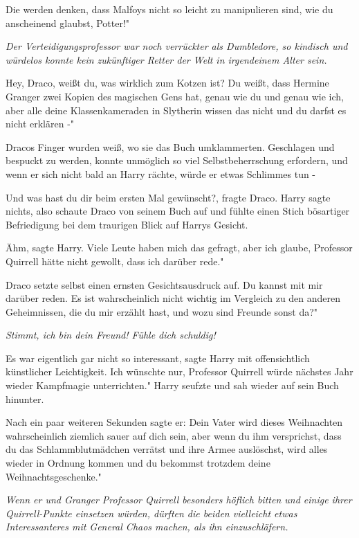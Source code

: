 \glqq{}Die werden denken, dass Malfoys nicht so leicht zu manipulieren sind, wie
du anscheinend glaubst, Potter!"

\emph{Der Verteidigungsprofessor war noch verrückter als Dumbledore, so
kindisch und würdelos konnte kein zukünftiger Retter der Welt in irgendeinem
Alter sein.}

\glqq{}Hey, Draco, weißt du, was wirklich zum Kotzen ist? Du weißt, dass Hermine
Granger zwei Kopien des magischen Gens hat, genau wie du und genau wie ich, aber
alle deine Klassenkameraden in Slytherin wissen das nicht und du darfst es nicht
erklären -"

Dracos Finger wurden weiß, wo sie das Buch umklammerten. Geschlagen und bespuckt
zu werden, konnte unmöglich so viel Selbstbeherrschung erfordern, und wenn er
sich nicht bald an Harry rächte, würde er etwas Schlimmes tun -

\glqq{}Und was hast du dir beim ersten Mal gewünscht?\grqq{}, fragte Draco. Harry
sagte nichts, also schaute Draco von seinem Buch auf und fühlte einen Stich
bösartiger Befriedigung bei dem traurigen Blick auf Harrys Gesicht.

\glqq{}Ähm\grqq{}, sagte Harry. \glqq{}Viele Leute haben mich das gefragt, aber
ich glaube, Professor Quirrell hätte nicht gewollt, dass ich darüber rede."

Draco setzte selbst einen ernsten Gesichtsausdruck auf. \glqq{}Du kannst mit mir
darüber reden. Es ist wahrscheinlich nicht wichtig im Vergleich zu den anderen
Geheimnissen, die du mir erzählt hast, und wozu sind Freunde sonst da?"

\emph{Stimmt, ich bin dein Freund! Fühle dich schuldig!}

\glqq{}Es war eigentlich gar nicht so interessant\grqq{}, sagte Harry mit
offensichtlich künstlicher Leichtigkeit. \glqq{}Ich wünschte nur, Professor
Quirrell würde nächstes Jahr wieder Kampfmagie unterrichten." Harry seufzte und
sah wieder auf sein Buch hinunter.

Nach ein paar weiteren Sekunden sagte er: \glqq{}Dein Vater wird dieses
Weihnachten wahrscheinlich ziemlich sauer auf dich sein, aber wenn du ihm
versprichst, dass du das Schlammblutmädchen verrätst und ihre Armee auslöschst,
wird alles wieder in Ordnung kommen und du bekommst trotzdem deine
Weihnachtsgeschenke."

\emph{Wenn er und Granger Professor Quirrell besonders höflich bitten und
einige ihrer Quirrell-Punkte einsetzen würden, dürften die beiden vielleicht
etwas Interessanteres mit General Chaos machen, als ihn einzuschläfern.}

